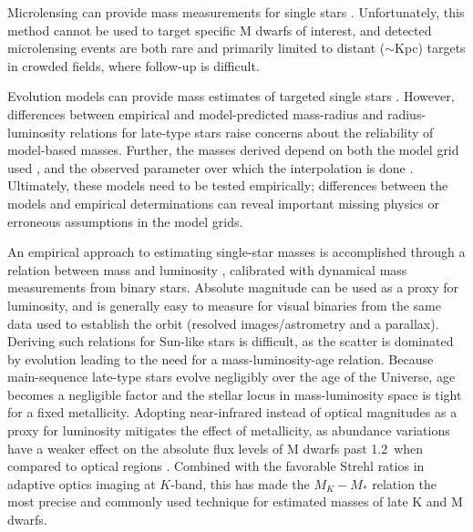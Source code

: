 \documentclass[twocolumn]{aastex62}
\begin{document}
Microlensing can provide mass measurements for single stars \citep[e.g.,][]{2016ApJ...825...60Z,2017ApJ...838..154C,2017AJ....154..176S}. Unfortunately, this method cannot be used to target specific M dwarfs of interest, and detected microlensing events are both rare and primarily limited to distant ($\sim$Kpc) targets in crowded fields, where follow-up is difficult. 

Evolution models can provide mass estimates of targeted single stars \citep[e.g.,][]{Muirhead2012a}. However, differences between empirical and model-predicted mass-radius and radius-luminosity relations for late-type stars \citep[e.g.,][]{Boyajian2012,Feiden2012a} raise concerns about the reliability of model-based masses. Further, the masses derived depend on both the model grid used \citep{Spada2013,MIST1}, and the observed parameter over which the interpolation is done \citep[e.g., color versus luminosity,][]{Mann:2012,Mann2015b}. Ultimately, these models need to be tested empirically; differences between the models and empirical determinations can reveal important missing physics or erroneous assumptions in the model grids. 

An empirical approach to estimating single-star masses is accomplished through a relation between mass and luminosity \citep[e.g.,][]{Hen1993, Delfosse2000}, calibrated with dynamical mass measurements from binary stars. Absolute magnitude can be used as a proxy for luminosity, and is generally easy to measure for visual binaries from the same data used to establish the orbit (resolved images/astrometry and a parallax). Deriving such relations for Sun-like stars is difficult, as the scatter is dominated by evolution \citep[e.g.,][]{1991A&ARv...3...91A,2010A&ARv..18...67T} leading to the need for a mass-luminosity-age relation. Because main-sequence late-type stars evolve negligibly over the age of the Universe, age becomes a negligible factor and the stellar locus in mass-luminosity space is tight for a fixed metallicity. Adopting near-infrared instead of optical magnitudes as a proxy for luminosity mitigates the effect of metallicity, as abundance variations have a weaker effect on the absolute flux levels of M dwarfs past 1.2\um\ when compared to optical regions \citep{Delfosse2000,Bonfils:2005}. Combined with the favorable Strehl ratios in adaptive optics imaging at $K$-band, this has made the $M_K-M_*$ relation the most precise and commonly used technique for estimated masses of late K and M dwarfs. 
\end{document}
